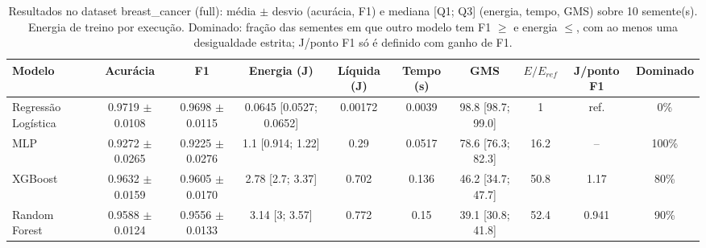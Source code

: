 \begin{table}[htbp]
\centering
\small
\caption{Resultados no dataset breast\_cancer (full): média $\pm$ desvio (acurácia, F1) e mediana [Q1; Q3] (energia, tempo, GMS) sobre 10 semente(s). Energia de treino por execução. Dominado: fração das sementes em que outro modelo tem F1 $\geq$ e energia $\leq$, com ao menos uma desigualdade estrita; J/ponto F1 só é definido com ganho de F1.}
\label{tab:resultados_breast_cancer_full}
\begin{tabular}{lccccccccc}
\toprule
\textbf{Modelo} & \textbf{Acurácia} & \textbf{F1} & \textbf{Energia (J)} & \textbf{Líquida (J)} & \textbf{Tempo (s)} & \textbf{GMS} & \textbf{$E/E_{ref}$} & \textbf{J/ponto F1} & \textbf{Dominado} \\
\midrule
Regressão Logística & 0.9719 $\pm$ 0.0108 & 0.9698 $\pm$ 0.0115 & 0.0645 [0.0527; 0.0652] & 0.00172 & 0.0039 & 98.8 [98.7; 99.0] & 1 & ref. & 0\% \\
MLP & 0.9272 $\pm$ 0.0265 & 0.9225 $\pm$ 0.0276 & 1.1 [0.914; 1.22] & 0.29 & 0.0517 & 78.6 [76.3; 82.3] & 16.2 & -- & 100\% \\
XGBoost & 0.9632 $\pm$ 0.0159 & 0.9605 $\pm$ 0.0170 & 2.78 [2.7; 3.37] & 0.702 & 0.136 & 46.2 [34.7; 47.7] & 50.8 & 1.17 & 80\% \\
Random Forest & 0.9588 $\pm$ 0.0124 & 0.9556 $\pm$ 0.0133 & 3.14 [3; 3.57] & 0.772 & 0.15 & 39.1 [30.8; 41.8] & 52.4 & 0.941 & 90\% \\
\bottomrule
\end{tabular}
\end{table}
